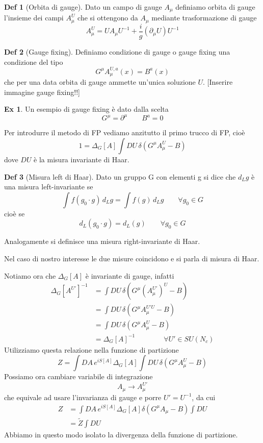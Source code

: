 \documentclass[10pt,a4paper]{article}
\theoremstyle{definition}
\newtheorem{definition}{Def}[section]
\newtheorem{example}{Ex}[section]
\begin{document}
\begin{definition}[Orbita di gauge]
    Dato un campo di gauge $A_\mu$ definiamo orbita di gauge l'insieme dei campi $A_\mu^U$ che si ottengono da $A_\mu$ mediante trasformazione di gauge
    \[
    A_\mu^U = U A_\mu U^{-1} + \frac{i}{g}(\partial_\mu U)U^{-1}    
    \]         
\end{definition}

\begin{definition}[Gauge fixing]
    Definiamo condizione di gauge o gauge fixing una condizione del tipo
    \[
    G^\mu A_\mu^{U, a}(x) = B^a(x)    
    \]        
    che per una data orbita di gauge ammette un'unica soluzione $U$.
    [Inserire immagine gauge fixing!!]
\end{definition}
\begin{example}
    Un esempio di gauge fixing è dato dalla scelta
    \[
    G^\mu = \partial^\mu \qquad B^a = 0    
    \]
\end{example}

Per introdurre il metodo di FP vediamo anzitutto il primo trucco di FP, cioè
\[
1 = \Delta_G[A] \int DU\, \delta(G^\mu A_\mu^U - B)    
\]
dove $DU$ è la misura invariante di Haar.

\begin{definition}[Misura left di Haar]
    Dato un gruppo G con elementi g si dice che $d_L g$ è una misura left-invariante se 
    \[
        \int f(g_0 \cdot g)\,d_L g = \int f(g)\,d_L g \qquad \forall g_0 \in G
    \]
    cioè se 
    \[
    d_L(g_0 \cdot g) = d_L(g) \qquad \forall g_0 \in G    
    \]
\end{definition}
Analogamente si definisce una misura right-invariante di Haar.

Nel caso di nostro interesse le due misure coincidono e si parla di misura di Haar.

Notiamo ora che $\Delta_G[A]$ è invariante di gauge, infatti
\begin{align*}
    \Delta_G[A^{U'}]^{-1} &= \int DU\,\delta(G^\mu(A_\mu^{U'})^U - B) \\
    &= \int DU\,\delta(G^\mu A_\mu^{U'U} - B)    \\
    &= \int DU\, \delta(G^\mu A_\mu^U - B) \\
    &= \Delta_G[A]^{-1} \qquad\qquad\forall U' \in SU(N_c)
\end{align*}
Utilizziamo questa relazione nella funzione di partizione 
\[
Z = \int DA\, e^{iS[A]}\Delta_G[A]\int DU\,\delta(G^\mu A_\mu^U - B)  
\]
Possiamo ora cambiare variabile di integrazione
\[
A_\mu \to A_\mu^{U'}    
\]
che equivale ad usare l'invarianza di gauge e porre $U' = U^{-1}$, da cui
\begin{align*}
    Z &= \int DA\, e^{iS[A]}\Delta_G[A]\delta(G^\mu A_\mu - B) \int DU \\
    &= \tilde{Z}\int DU
\end{align*}
Abbiamo in questo modo isolato la divergenza della funzione di partizione. 
\end{document}
